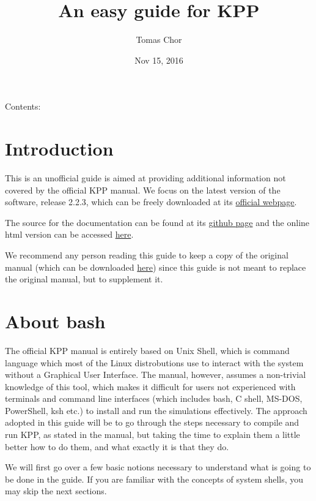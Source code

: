 \documentclass[letterpaper,10pt,openany,oneside]{sphinxmanual}
\title{An easy guide for KPP}
\date{Nov 15, 2016}
\author{Tomas Chor}
\begin{document}
\maketitle
\tableofcontents
{}\label{index::doc}


Contents:


\chapter{Introduction}
\label{README:introduction}\label{README:easy-guide-to-compiling-and-running-kpp}\label{README::doc}
This is an unofficial guide is aimed at providing additional information not
covered by the official KPP manual. We focus on the latest version of the
software, release 2.2.3, which can be freely downloaded at its \href{http://people.cs.vt.edu/~asandu/Software/Kpp/}{official
webpage}.

The source for the documentation can be found at its \href{https://github.com/tomchor/ezkpp}{github page} and the online html version can be
accessed \href{https://tomchor.github.io/ezkpp/}{here}.

We recommend any person reading this guide to keep a copy of the original
manual (which can be downloaded \href{http://people.cs.vt.edu/~asandu/Software/Kpp/}{here}) since this guide is not
meant to replace the original manual, but to supplement it.


\chapter{About bash}
\label{bash:about-bash}\label{bash::doc}
The official KPP manual is entirely based on Unix Shell, which is command
language which most of the Linux distrobutions use to interact with the system
without a Graphical User Interface. The manual, however, assumes a non-trivial
knowledge of this tool, which makes it difficult for users not experienced with
terminals and command line interfaces (which includes bash, C shell, MS-DOS,
PowerShell, ksh etc.) to install and run the simulations effectively. The
approach adopted in this guide will be to go through the steps necessary to
compile and run KPP, as stated in the manual, but taking the time to explain
them a little better how to do them, and what exactly it is that they do.

We will first go over a few basic notions necessary to understand what is going
to be done in the guide. If you are familiar with the concepts of system shells,
you may skip the next sections.
\end{document}
